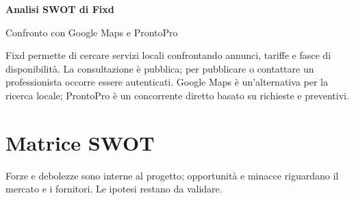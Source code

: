 \documentclass[a4paper]{article}
\begin{document}
\begin{center}
  {\LARGE\bfseries\color{fixdblue} Analisi SWOT di Fixd\par}
  \smallskip
  {\large Confronto con Google Maps e ProntoPro\par}
  \bigskip
  
\end{center}

Fixd permette di cercare servizi locali confrontando annunci, tariffe e
fasce di disponibilità. La consultazione è pubblica; per pubblicare o
contattare un professionista occorre essere autenticati.
Google Maps è un'alternativa per la ricerca locale; ProntoPro è un
concorrente diretto basato su richieste e preventivi.

\section*{Matrice SWOT}

Forze e debolezze sono interne al progetto; opportunità e minacce
riguardano il mercato e i fornitori. Le ipotesi restano da validare.
\end{document}
